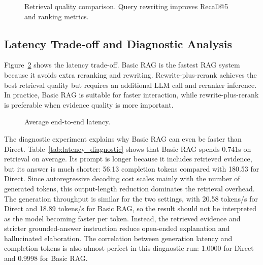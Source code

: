 \begin{figure}[t]
\centering
{}
\caption{Retrieval quality comparison. Query rewriting improves Recall@5 and ranking metrics.}
\label{fig:retrieval}
\end{figure}

\subsection{Latency Trade-off and Diagnostic Analysis}

Figure~\ref{fig:latency} shows the latency trade-off. Basic RAG is the fastest RAG system because it avoids extra reranking and rewriting. Rewrite-plus-rerank achieves the best retrieval quality but requires an additional LLM call and reranker inference. In practice, Basic RAG is suitable for faster interaction, while rewrite-plus-rerank is preferable when evidence quality is more important.

\begin{figure}[t]
\centering
{}
\caption{Average end-to-end latency.}
\label{fig:latency}
\end{figure}

The diagnostic experiment explains why Basic RAG can even be faster than Direct. Table~\ref{tab:latency_diagnostic} shows that Basic RAG spends 0.741s on retrieval on average. Its prompt is longer because it includes retrieved evidence, but its answer is much shorter: 56.13 completion tokens compared with 180.53 for Direct. Since autoregressive decoding cost scales mainly with the number of generated tokens, this output-length reduction dominates the retrieval overhead. The generation throughput is similar for the two settings, with 20.58 tokens/s for Direct and 18.89 tokens/s for Basic RAG, so the result should not be interpreted as the model becoming faster per token. Instead, the retrieved evidence and stricter grounded-answer instruction reduce open-ended explanation and hallucinated elaboration. The correlation between generation latency and completion tokens is also almost perfect in this diagnostic run: 1.0000 for Direct and 0.9998 for Basic RAG.

\begin{table}[t]
\centering
\caption{Latency diagnostic for Direct and Basic RAG on the same 30 questions.}
\label{tab:latency_diagnostic}
\end{table}

